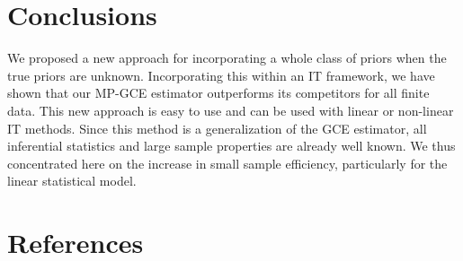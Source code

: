 \documentclass{elsarticle}
\begin{document}

\section{Conclusions}
\label{sec: conc}

We proposed a new approach for incorporating a whole class of priors when the true 
priors are unknown. 
Incorporating this within an IT framework, we have shown that our MP-GCE estimator 
outperforms its competitors for all finite data. 
This new approach is easy to use and can be used with linear or non-linear IT methods. 
Since this method is a generalization of the GCE estimator, all inferential statistics and 
large sample properties are already well known. 
We thus concentrated here on the increase in small sample efficiency, particularly for
the linear statistical model.


\newpage
\cleardoublepage
\singlespacing

\section*{References}

\end{document}
